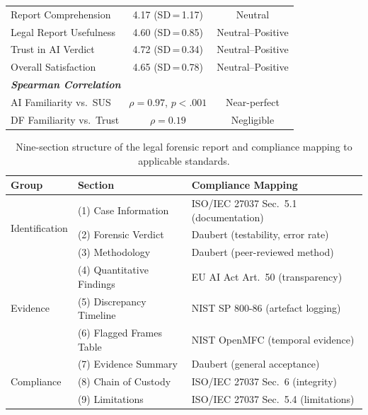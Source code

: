 \documentclass[12pt]{article}
\begin{document}
\begin{table}[H]
\begin{tabular}{p{5.8cm} c c}
\quad Report Comprehension       & 4.17 (SD\,=\,1.17)  & Neutral \\
\quad Legal Report Usefulness    & 4.60 (SD\,=\,0.85)  & Neutral--Positive \\
\quad Trust in AI Verdict        & 4.72 (SD\,=\,0.34)  & Neutral--Positive \\
\quad Overall Satisfaction       & 4.65 (SD\,=\,0.78)  & Neutral--Positive \\
\midrule
\multicolumn{3}{l}{\cellcolor{rowgray}\textit{\textbf{Spearman Correlation}}} \\
\quad AI Familiarity vs.\ SUS    & $\rho=0.97$, $p<.001$& Near-perfect \\
\quad DF Familiarity vs.\ Trust  & $\rho=0.19$          & Negligible \\
\bottomrule
\end{tabular}
\end{table}

\begin{table}[H]
\centering
\caption{Nine-section structure of the legal forensic report and compliance
mapping to applicable standards.}
\label{tab:legal}
\small
\renewcommand{\arraystretch}{1.15}
\begin{tabular}{l l p{5.0cm}}
\toprule
\textbf{Group} & \textbf{Section} & \textbf{Compliance Mapping} \\
\midrule
\multirow{3}{*}{Identification}
  & (1) Case Information  & ISO/IEC 27037 Sec.~5.1 (documentation) \\
  & (2) Forensic Verdict  & Daubert (testability, error rate) \\
  & (3) Methodology       & Daubert (peer-reviewed method) \\
\midrule
\multirow{3}{*}{Evidence}
  & (4) Quantitative Findings & EU AI Act Art.~50 (transparency) \\
  & (5) Discrepancy Timeline  & NIST SP 800-86 (artefact logging) \\
  & (6) Flagged Frames Table  & NIST OpenMFC (temporal evidence) \\
\midrule
\multirow{3}{*}{Compliance}
  & (7) Evidence Summary      & Daubert (general acceptance) \\
  & (8) Chain of Custody      & ISO/IEC 27037 Sec.~6 (integrity) \\
  & (9) Limitations           & ISO/IEC 27037 Sec.~5.4 (limitations) \\
\bottomrule
\end{tabular}
\end{table}
\end{document}
